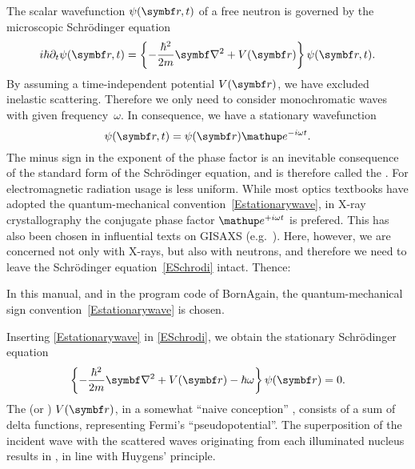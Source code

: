 \def\Vmac{\tilde{V}}

%
The scalar wavefunction $\psi(\r,t)$
%
%
%
of a free neutron
is governed by the microscopic Schrödinger equation
\begin{equation}\label{ESchrodi}
  i\hbar\partial_t \psi(\r,t)
  = \left\{-\frac{\hbar^2}{2m}\Nabla^2+V(\r)\right\} \psi(\r,t).
\end{equation}
By assuming a time-independent potential $V(\r)$,
we have excluded inelastic scattering.
Therefore we only need to consider monochromatic waves
with given frequency~$\omega$.
%
In consequence, we have a stationary wavefunction
\begin{equation}\label{Estationarywave}
  \psi(\r,t) = \psi(\r)\e^{-i\omega t}.
\end{equation}
%
The minus sign in the exponent of the phase factor
is an inevitable consequence of the standard form of the Schrödinger equation,
and is therefore called the .
%
%
%
For electromagnetic radiation
usage is less uniform.
While most optics textbooks
have adopted the quantum-mechanical convention~\cref{Estationarywave},
in X-ray crystallography
the conjugate phase factor $\e^{+i\omega t}$ is prefered.
This  has also been chosen
in influential texts on GISAXS (e.g.\ \cite{ReLL09}).
Here, however, we are concerned not only with X-rays,
but also with neutrons,
and therefore we need to leave the Schrödinger equation~\cref{ESchrodi} intact.
Thence:

\Note
{\indent In this manual, and in the program code of BornAgain,
the quantum-mechanical sign convention~\cref{Estationarywave} is chosen.}
%

Inserting \cref{Estationarywave} in \cref{ESchrodi},
we obtain the stationary Schrödinger equation
\begin{equation}\label{EstatSchrodi}
  \left\{-\frac{\hbar^2}{2m}\Nabla^2+V(\r)-\hbar\omega\right\} \psi(\r) = 0.
\end{equation}
%
%
%
%
The  (or )
 $V(\r)$,
in a somewhat ``naive conception'' \cite[p.~7]{Sea89},
consists of a sum of delta functions,
representing Fermi's ``pseudopotential''.
%
The superposition of the incident wave with the scattered waves
originating from each illuminated nucleus
results in ,
%
in line with Huygens' principle.
%

